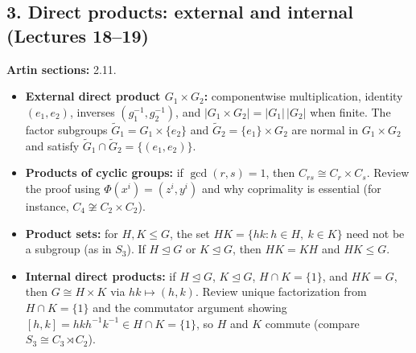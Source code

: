 \documentclass[11pt,reqno]{amsart}
\begin{document}
\subsection*{3. Direct products: external and internal (Lectures 18--19)}
\noindent\textbf{Artin sections:} 2.11.\par
\begin{itemize}
\item \textbf{External direct product $G_1\times G_2$:} componentwise multiplication,
identity $(e_1,e_2)$, inverses $(g_1^{-1},g_2^{-1})$, and
$|G_1\times G_2|=|G_1|\,|G_2|$ when finite. The factor subgroups
$\widetilde G_1=G_1\times\{e_2\}$ and $\widetilde G_2=\{e_1\}\times G_2$ are normal
in $G_1\times G_2$ and satisfy $\widetilde G_1\cap\widetilde G_2=\{(e_1,e_2)\}$.
\item \textbf{Products of cyclic groups:} if $\gcd(r,s)=1$, then
$C_{rs}\cong C_r\times C_s$. Review the proof using $\Phi(x^i)=(z^i,y^i)$ and why
coprimality is essential (for instance, $C_4\not\cong C_2\times C_2$).
\item \textbf{Product sets:} for $H,K\leq G$, the set $HK=\{hk:h\in H,\ k\in K\}$
need not be a subgroup (as in $S_3$). If $H\trianglelefteq G$ or
$K\trianglelefteq G$, then $HK=KH$ and $HK\leq G$.
\item \textbf{Internal direct products:} if $H\trianglelefteq G$, $K\trianglelefteq G$,
$H\cap K=\{1\}$, and $HK=G$, then $G\cong H\times K$ via $hk\mapsto(h,k)$.
Review unique factorization from $H\cap K=\{1\}$ and the commutator argument showing
$[h,k]=hkh^{-1}k^{-1}\in H\cap K=\{1\}$, so $H$ and $K$ commute (compare $S_3\cong C_3\rtimes C_2$).
\end{itemize}
\end{document}
